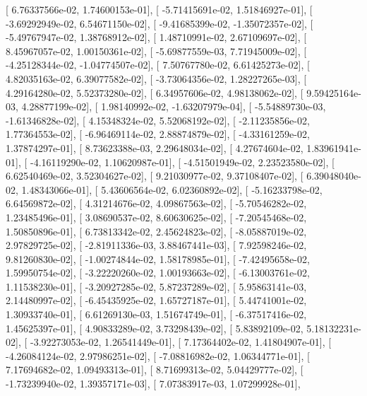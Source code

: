 \documentclass{article}
\begin{document}
       [  6.76337566e-02,   1.74600153e-01],
       [ -5.71415691e-02,   1.51846927e-01],
       [ -3.69292949e-02,   6.54671150e-02],
       [ -9.41685399e-02,  -1.35072357e-02],
       [ -5.49767947e-02,   1.38768912e-02],
       [  1.48710991e-02,   2.67109697e-02],
       [  8.45967057e-02,   1.00150361e-02],
       [ -5.69877559e-03,   7.71945009e-02],
       [ -4.25128344e-02,  -1.04774507e-02],
       [  7.50767780e-02,   6.61425273e-02],
       [  4.82035163e-02,   6.39077582e-02],
       [ -3.73064356e-02,   1.28227265e-03],
       [  4.29164280e-02,   5.52373280e-02],
       [  6.34957606e-02,   4.98138062e-02],
       [  9.59425164e-03,   4.28877199e-02],
       [  1.98140992e-02,  -1.63207979e-04],
       [ -5.54889730e-03,  -1.61346828e-02],
       [  4.15348324e-02,   5.52068192e-02],
       [ -2.11235856e-02,   1.77364553e-02],
       [ -6.96469114e-02,   2.88874879e-02],
       [ -4.33161259e-02,   1.37874297e-01],
       [  8.73623388e-03,   2.29648034e-02],
       [  4.27674604e-02,   1.83961941e-01],
       [ -4.16119290e-02,   1.10620987e-01],
       [ -4.51501949e-02,   2.23523580e-02],
       [  6.62540469e-02,   3.52304627e-02],
       [  9.21030977e-02,   9.37108407e-02],
       [  6.39048040e-02,   1.48343066e-01],
       [  5.43606564e-02,   6.02360892e-02],
       [ -5.16233798e-02,   6.64569872e-02],
       [  4.31214676e-02,   4.09867563e-02],
       [ -5.70546282e-02,   1.23485496e-01],
       [  3.08690537e-02,   8.60630625e-02],
       [ -7.20545468e-02,   1.50850896e-01],
       [  6.73813342e-02,   2.45624823e-02],
       [ -8.05887019e-02,   2.97829725e-02],
       [ -2.81911336e-03,   3.88467441e-03],
       [  7.92598246e-02,   9.81260830e-02],
       [ -1.00274844e-02,   1.58178985e-01],
       [ -7.42495658e-02,   1.59950754e-02],
       [ -3.22220260e-02,   1.00193663e-02],
       [ -6.13003761e-02,   1.11538230e-01],
       [ -3.20927285e-02,   5.87237289e-02],
       [  5.95863141e-03,   2.14480997e-02],
       [ -6.45435925e-02,   1.65727187e-01],
       [  5.44741001e-02,   1.30933740e-01],
       [  6.61269130e-03,   1.51674749e-01],
       [ -6.37517416e-02,   1.45625397e-01],
       [  4.90833289e-02,   3.73298439e-02],
       [  5.83892109e-02,   5.18132231e-02],
       [ -3.92273053e-02,   1.26541449e-01],
       [  7.17364402e-02,   1.41804907e-01],
       [ -4.26084124e-02,   2.97986251e-02],
       [ -7.08816982e-02,   1.06344771e-01],
       [  7.17694682e-02,   1.09493313e-01],
       [  8.71699313e-02,   5.04429777e-02],
       [ -1.73239940e-02,   1.39357171e-03],
       [  7.07383917e-03,   1.07299928e-01],
\end{document}
